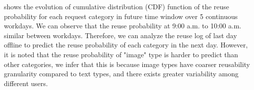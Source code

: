 \noindent
{} shows the evolution of cumulative distribution (CDF) function of 
the reuse probability for each request category in future time window over 5 continuous workdays.
We can observe that the reuse probability at 9:00 a.m. to 10:00 a.m.
similar between workdays. Therefore, we can analyze the reuse log
of last day offline to predict the reuse probability of each category 
in the next day. However, it is noted that the reuse probability of 
"image" type is harder to predict than other categories, 
we infer that this is because image types have coarser reusability granularity 
compared to text types, and there exists greater variability among different users.
